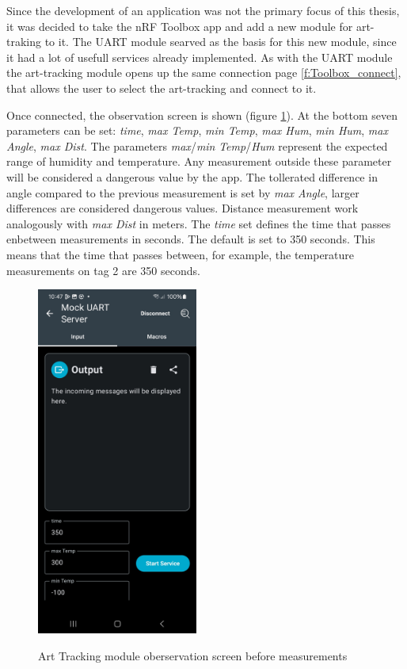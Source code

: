 Since the development of an application was not the primary focus of this thesis, it was decided to take the nRF Toolbox app and add a new module for art-traking to it.
The UART module searved as the basis for this new module, since it had a lot of usefull services already implemented.
As with the UART module the art-tracking module opens up the same connection page \ref{f:Toolbox_connect}, that allows the user to select the art-tracking and connect to it.

Once connected, the observation screen is shown (figure \ref{f:Toolbox_art_tracking_empty}).
At the bottom seven parameters can be set: \textit{time}, \textit{max Temp}, \textit{min Temp}, \textit{max Hum}, \textit{min Hum}, \textit{max Angle}, \textit{max Dist}.
The parameters \textit{max}/\textit{min} \textit{Temp}/\textit{Hum} represent the expected range of humidity and temperature.
Any measurement outside these parameter will be considered a dangerous value by the app.
The tollerated difference in angle compared to the previous measurement is set by \textit{max Angle}, larger differences are considered dangerous values.
Distance measurement work analogously with \textit{max Dist} in meters.
The \textit{time} set defines the time that passes enbetween measurements in seconds.
The default is set to 350 seconds.
This means that the time that passes between, for example, the temperature measurements on tag 2 are 350 seconds.


\begin{figure}[ht!]
\centering
 \caption{Art Tracking module oberservation screen before measurements}
\includegraphics[width=200px]{graphics/nRF_toolbox_art_tracking_empty.jpg}
\label{f:Toolbox_art_tracking_empty}
\end{figure}


